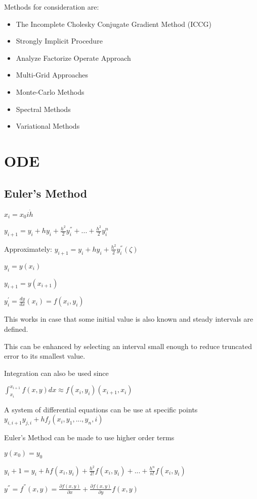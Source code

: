 \documentclass[11pt]{article}
\begin{document}
Methods for consideration are:
\begin{itemize}
\item The Incomplete Cholesky Conjugate Gradient Method (ICCG)
\item Strongly Implicit Procedure
\item Analyze Factorize Operate Approach
\item Multi-Grid Approaches
\item Monte-Carlo Methods
\item Spectral Methods
\item Variational Methods
\end{itemize}


\section {ODE}
\subsection { Euler's Method}

$x_i = x_0 i \dot h$ 

$y_{i+1} = y_i + hy_i + \frac{h^2}{2} y_i^{''} + ... + \frac{h^2}{2} y_i^{n} $

Approximately:  $y_{i+1} = y_i + hy_i + \frac{h^2}{2} y_i^{''} (\zeta ) $

$y_i = y(x_i) $

$y_{i+1} = y (x_{i+1}) $

$y^{'}_i = \frac{dy}{dx} (x_i) = f(x_i, y_i)$

This works in case that some initial value is also known and steady intervals are defined.  

This can be enhanced by selecting an interval small enough to reduce truncated error to its smallest value.

Integration can also be used since 

$\int^{x_{i+1}}_{x_i} f (x,y) dx \approx f(x_i,y_i) (x_{i+1} , x_i)$

A system of differential equations can be use at specific points $y_{i,i+1} y_{j,i} +h f_j (x_i, y_1, ..., y_n, i)$

Euler's Method can be made to use higher order terms 

$y(x_0) = y_0$

$y_i+1 = y_i +h f(x_i, y_i)  + \frac{h^2}{2!} f(x_i,y_i) + ... + \frac{h^n}{n!} f(x_i,y_i)$

$y^{''} = f^{''}(x,y) = \frac{\partial f(x,y)}{\partial x} + \frac{\partial f(x,y)}{\partial y} f(x,y)$
\end{document}
